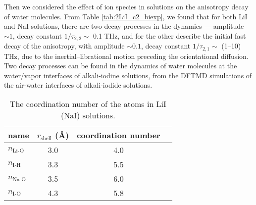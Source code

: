 Then we considered the effect of ion species in solutions on the anisotropy decay of water molecules.
From Table \ref{tab:2LiI_c2_biexp}, we found that for both LiI and NaI solutions, there are two decay processes in the dynamics --- amplitude $\sim 1$,
decay constant $1/\tau_{2,2}\sim$ 0.1 THz, and for the other describe the initial fast decay 
of the anisotropy, with amplitude $\sim 0.1$, decay constant $1/\tau_{2,1}\sim$ (1--10) THz, 
due to the inertial--librational motion preceding the orientational diffusion.
Two decay processes can be found in the dynamics of water molecules 
at the water/vapor interfaces of alkali-iodine solutions, from the DFTMD simulations of the air-water interfaces of alkali-iodide solutions.
%
\begin{table}[H] %
\centering
\caption{\label{tab:table_CoordNo}%
The coordination number of the atoms in LiI (NaI) solutions.}
\begin{tabular}{lccc}
name & $r_\text{shell}$ (\AA) & coordination number \\
\hline
$n_\text{Li-O}$ & 3.0 & 4.0 \\
$n_\text{I-H}$ & 3.3 & 5.5 \\
$n_\text{Na-O}$ & 3.5 & 6.0 \\ 
$n_\text{I-O}$ & 4.3 & 5.8 \\
\end{tabular}
\end{table}



